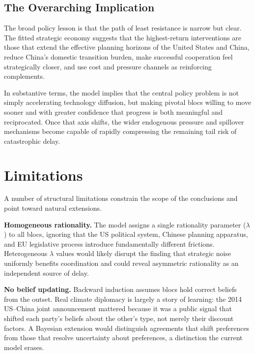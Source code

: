 \documentclass[12pt,a4paper]{article}
\begin{document}
\subsection{The Overarching Implication}

The broad policy lesson is that the path of least resistance is narrow but clear. The fitted strategic economy suggests that the highest-return interventions are those that extend the effective planning horizons of the United States and China, reduce China's domestic transition burden, make successful cooperation feel strategically closer, and use cost and pressure channels as reinforcing complements.

In substantive terms, the model implies that the central policy problem is not simply accelerating technology diffusion, but making pivotal blocs willing to move sooner and with greater confidence that progress is both meaningful and reciprocated. Once that axis shifts, the wider endogenous pressure and spillover mechanisms become capable of rapidly compressing the remaining tail risk of catastrophic delay.

\section{Limitations}

A number of structural limitations constrain the scope of the conclusions and point toward natural extensions.

\textbf{Homogeneous rationality.} The model assigns a single rationality parameter ($\lambda$) to all blocs, ignoring that the US political system, Chinese planning apparatus, and EU legislative process introduce fundamentally different frictions. Heterogeneous $\lambda$ values would likely disrupt the finding that strategic noise uniformly benefits coordination and could reveal asymmetric rationality as an independent source of delay.

\textbf{No belief updating.} Backward induction assumes blocs hold correct beliefs from the outset. Real climate diplomacy is largely a story of learning: the 2014 US--China joint announcement mattered because it was a public signal that shifted each party's beliefs about the other's type, not merely their discount factors. A Bayesian extension would distinguish agreements that shift preferences from those that resolve uncertainty about preferences, a distinction the current model erases.
\end{document}
